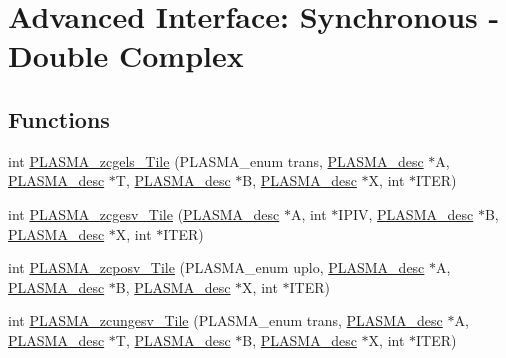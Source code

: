 \hypertarget{group__PLASMA__Complex64__t__Tile}{}\section{Advanced Interface\+: Synchronous -\/ Double Complex}
\label{group__PLASMA__Complex64__t__Tile}
\subsection*{Functions}
\begin{DoxyCompactItemize}
\item 
int \hyperlink{group__PLASMA__Complex64__t__Tile_ga6bd738a1ffefcf9d561cd5d82a7e2f10_ga6bd738a1ffefcf9d561cd5d82a7e2f10}{P\+L\+A\+S\+M\+A\+\_\+zcgels\+\_\+\+Tile} (P\+L\+A\+S\+M\+A\+\_\+enum trans, \hyperlink{structplasma__desc__t}{P\+L\+A\+S\+M\+A\+\_\+desc} $\ast$A, \hyperlink{structplasma__desc__t}{P\+L\+A\+S\+M\+A\+\_\+desc} $\ast$T, \hyperlink{structplasma__desc__t}{P\+L\+A\+S\+M\+A\+\_\+desc} $\ast$B, \hyperlink{structplasma__desc__t}{P\+L\+A\+S\+M\+A\+\_\+desc} $\ast$X, int $\ast$I\+T\+E\+R)
\item 
int \hyperlink{group__PLASMA__Complex64__t__Tile_ga1323bdbc5973b2ee613e9c128a98d419_ga1323bdbc5973b2ee613e9c128a98d419}{P\+L\+A\+S\+M\+A\+\_\+zcgesv\+\_\+\+Tile} (\hyperlink{structplasma__desc__t}{P\+L\+A\+S\+M\+A\+\_\+desc} $\ast$A, int $\ast$I\+P\+I\+V, \hyperlink{structplasma__desc__t}{P\+L\+A\+S\+M\+A\+\_\+desc} $\ast$B, \hyperlink{structplasma__desc__t}{P\+L\+A\+S\+M\+A\+\_\+desc} $\ast$X, int $\ast$I\+T\+E\+R)
\item 
int \hyperlink{group__PLASMA__Complex64__t__Tile_ga0be255f00d6a4cc70a544a715bdc6dd3_ga0be255f00d6a4cc70a544a715bdc6dd3}{P\+L\+A\+S\+M\+A\+\_\+zcposv\+\_\+\+Tile} (P\+L\+A\+S\+M\+A\+\_\+enum uplo, \hyperlink{structplasma__desc__t}{P\+L\+A\+S\+M\+A\+\_\+desc} $\ast$A, \hyperlink{structplasma__desc__t}{P\+L\+A\+S\+M\+A\+\_\+desc} $\ast$B, \hyperlink{structplasma__desc__t}{P\+L\+A\+S\+M\+A\+\_\+desc} $\ast$X, int $\ast$I\+T\+E\+R)
\item 
int \hyperlink{group__PLASMA__Complex64__t__Tile_ga5eecfe4fcf4814dd939f39c0629d2222_ga5eecfe4fcf4814dd939f39c0629d2222}{P\+L\+A\+S\+M\+A\+\_\+zcungesv\+\_\+\+Tile} (P\+L\+A\+S\+M\+A\+\_\+enum trans, \hyperlink{structplasma__desc__t}{P\+L\+A\+S\+M\+A\+\_\+desc} $\ast$A, \hyperlink{structplasma__desc__t}{P\+L\+A\+S\+M\+A\+\_\+desc} $\ast$T, \hyperlink{structplasma__desc__t}{P\+L\+A\+S\+M\+A\+\_\+desc} $\ast$B, \hyperlink{structplasma__desc__t}{P\+L\+A\+S\+M\+A\+\_\+desc} $\ast$X, int $\ast$I\+T\+E\+R)

\end{DoxyCompactItemize}
